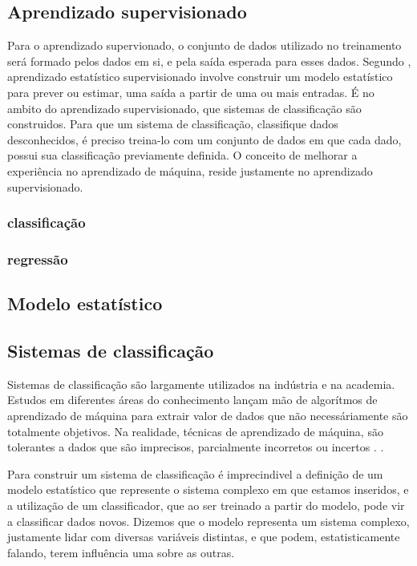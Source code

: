 \subsection{Aprendizado supervisionado}
Para o aprendizado supervionado, o conjunto de dados utilizado no treinamento será formado pelos dados em si, e pela saída esperada para esses dados\cite{Louridas}. Segundo \cite{James}, aprendizado estatístico supervisionado involve construir um modelo estatístico para prever ou estimar, uma saída a partir de uma ou mais entradas.  É no ambito do aprendizado supervisionado,
que sistemas de classificação são construidos. Para que um sistema de classificação, classifique dados desconhecidos, é preciso treina-lo com um conjunto de dados em que cada dado, possui sua classificação previamente definida.  O conceito de melhorar a experiência no aprendizado de máquina, reside justamente no aprendizado supervisionado.

\subsubsection{classificação}

\subsubsection{regressão}

\subsection{Modelo estatístico}

\subsection{Sistemas de classificação}
Sistemas de classificação são largamente utilizados na indústria e na academia. Estudos em diferentes áreas do conhecimento
lançam mão de algorítmos de aprendizado de máquina para extrair valor de dados que não necessáriamente são totalmente objetivos. Na realidade,
técnicas de aprendizado de máquina, são tolerantes a dados que são imprecisos, parcialmente incorretos ou incertos \cite{Malhotra}. .



Para construir um sistema de classificação é imprecindivel a definição de um modelo estatístico que represente o sistema complexo em que estamos inseridos, e a utilização de um classificador, que ao ser treinado a partir do modelo, pode vir a classificar dados novos. Dizemos que o modelo representa um sistema complexo, justamente lidar com diversas variáveis distintas, e que podem, estatisticamente falando, terem influência uma sobre as outras.
